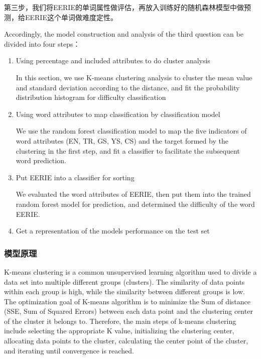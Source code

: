 \documentclass[
]{article}
\begin{document}
第三步，我们将EERIE的单词属性做评估，再放入训练好的随机森林模型中做预测，给EERIE这个单词做难度定性。

Accordingly, the model construction and analysis of the third question
can be divided into four steps：

\begin{enumerate}
\def\labelenumi{\arabic{enumi}.}
\item
  Using percentage and included attributes to do cluster analysis

  In this section, we use K-means clustering analysis to cluster the
  mean value and standard deviation according to the distance, and fit
  the probability distribution histogram for difficulty classification
\item
  Using word attributes to map classification by classification model

  We use the random forest classification model to map the five
  indicators of word attributes (EN, TR, GS, YS, CS) and the target
  formed by the clustering in the first step, and fit a classifier to
  facilitate the subsequent word prediction.
\item
  Put EERIE into a classifier for sorting

  We evaluated the word attributes of EERIE, then put them into the
  trained random forest model for prediction, and determined the
  difficulty of the word EERIE.
\item
  Get a representation of the model\textquotesingle s performance on the
  test set
\end{enumerate}

\hypertarget{ux6a21ux578bux539fux7406}{%
\subsubsection{模型原理}\label{ux6a21ux578bux539fux7406}}

K-means clustering is a common unsupervised learning algorithm used to
divide a data set into multiple different groups (clusters). The
similarity of data points within each group is high, while the
similarity between different groups is low. The optimization goal of
K-means algorithm is to minimize the Sum of distance (SSE, Sum of
Squared Errors) between each data point and the clustering center of the
cluster it belongs to. Therefore, the main steps of k-means clustering
include selecting the appropriate K value, initializing the clustering
center, allocating data points to the cluster, calculating the center
point of the cluster, and iterating until convergence is reached.
\end{document}
